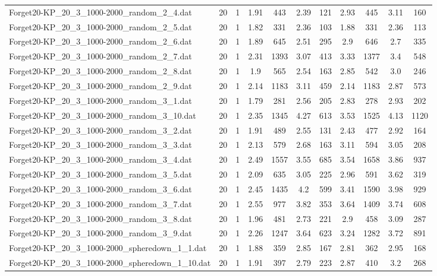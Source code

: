 \begin{table}[!ht]
\begin{tabular}{lcccccccccc}
Forget20-KP\_20\_3\_1000-2000\_random\_2\_4.dat & 20 & 1 & 1.91 & 443 & 2.39 & 121 & 2.93 & 445 & 3.11 & 160 \\
Forget20-KP\_20\_3\_1000-2000\_random\_2\_5.dat & 20 & 1 & 1.82 & 331 & 2.36 & 103 & 1.88 & 331 & 2.36 & 113 \\
Forget20-KP\_20\_3\_1000-2000\_random\_2\_6.dat & 20 & 1 & 1.89 & 645 & 2.51 & 295 & 2.9 & 646 & 2.7 & 335 \\
Forget20-KP\_20\_3\_1000-2000\_random\_2\_7.dat & 20 & 1 & 2.31 & 1393 & 3.07 & 413 & 3.33 & 1377 & 3.4 & 548 \\
Forget20-KP\_20\_3\_1000-2000\_random\_2\_8.dat & 20 & 1 & 1.9 & 565 & 2.54 & 163 & 2.85 & 542 & 3.0 & 246 \\
Forget20-KP\_20\_3\_1000-2000\_random\_2\_9.dat & 20 & 1 & 2.14 & 1183 & 3.11 & 459 & 2.14 & 1183 & 2.87 & 573 \\
Forget20-KP\_20\_3\_1000-2000\_random\_3\_1.dat & 20 & 1 & 1.79 & 281 & 2.56 & 205 & 2.83 & 278 & 2.93 & 202 \\
Forget20-KP\_20\_3\_1000-2000\_random\_3\_10.dat & 20 & 1 & 2.35 & 1345 & 4.27 & 613 & 3.53 & 1525 & 4.13 & 1120 \\
Forget20-KP\_20\_3\_1000-2000\_random\_3\_2.dat & 20 & 1 & 1.91 & 489 & 2.55 & 131 & 2.43 & 477 & 2.92 & 164 \\
Forget20-KP\_20\_3\_1000-2000\_random\_3\_3.dat & 20 & 1 & 2.13 & 579 & 2.68 & 163 & 3.11 & 594 & 3.05 & 208 \\
Forget20-KP\_20\_3\_1000-2000\_random\_3\_4.dat & 20 & 1 & 2.49 & 1557 & 3.55 & 685 & 3.54 & 1658 & 3.86 & 937 \\
Forget20-KP\_20\_3\_1000-2000\_random\_3\_5.dat & 20 & 1 & 2.09 & 635 & 3.05 & 225 & 2.96 & 591 & 3.62 & 319 \\
Forget20-KP\_20\_3\_1000-2000\_random\_3\_6.dat & 20 & 1 & 2.45 & 1435 & 4.2 & 599 & 3.41 & 1590 & 3.98 & 929 \\
Forget20-KP\_20\_3\_1000-2000\_random\_3\_7.dat & 20 & 1 & 2.55 & 977 & 3.82 & 353 & 3.64 & 1409 & 3.74 & 608 \\
Forget20-KP\_20\_3\_1000-2000\_random\_3\_8.dat & 20 & 1 & 1.96 & 481 & 2.73 & 221 & 2.9 & 458 & 3.09 & 287 \\
Forget20-KP\_20\_3\_1000-2000\_random\_3\_9.dat & 20 & 1 & 2.26 & 1247 & 3.64 & 623 & 3.24 & 1282 & 3.72 & 891 \\
Forget20-KP\_20\_3\_1000-2000\_spheredown\_1\_1.dat & 20 & 1 & 1.88 & 359 & 2.85 & 167 & 2.81 & 362 & 2.95 & 168 \\
Forget20-KP\_20\_3\_1000-2000\_spheredown\_1\_10.dat & 20 & 1 & 1.91 & 397 & 2.79 & 223 & 2.87 & 410 & 3.2 & 268 \\

\end{tabular}
\end{table}
